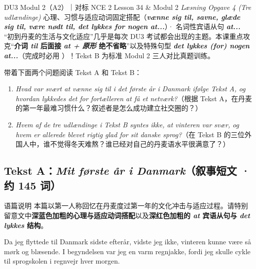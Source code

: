 {DU3 Modul 2（A2）｜对标 NCE 2 Lesson 34 \& Modul 2 \textit{Læsning Opgave 4 (Tre udlændinge)}}
{心理、习惯与适应动词固定搭配（\textbf{\textit{vænne sig til, savne, glæde sig til, være nødt til, det lykkes for nogen at...}}）· 名词性宾语从句 \textbf{\textit{at...}}}
{“初到丹麦的生活与文化适应”几乎是每次 DU3 考试都会出现的主题。本课重点攻克“\textbf{介词 \textit{til} 后面接 \textit{at + 原形} 绝不省略}”以及特殊句型 \textbf{\textit{det lykkes (for) nogen at...}}（完成时必用 ）！Tekst B 为标准 Modul 2 三人对比真题训练。}

\begin{foerduleaeser}
带着下面两个问题阅读 Tekst A 和 Tekst B：
\begin{enumerate}
  \item \textit{Hvad var svært at vænne sig til i det første år i Danmark ifølge Tekst A, og hvordan lykkedes det for fortælleren at få et netværk?}（根据 Tekst A，在丹麦的第一年最难习惯什么？叙述者是怎么成功建立社交圈的？）
  \item \textit{Hvem af de tre udlændinge i Tekst B syntes ikke, at vinteren var svær, og hvem er allerede blevet rigtig glad for sit danske sprog?}（在 Tekst B 的三位外国人中，谁不觉得冬天难熬？谁已经对自己的丹麦语水平很满意了？）
\end{enumerate}
\end{foerduleaeser}


\subsection*{Tekst A：\textit{Mit første år i Danmark}（叙事短文 · 约 145 词）}

\begin{tipbox}{语篇说明}
本篇以第一人称回忆在丹麦度过第一年的文化冲击与适应过程。请特别留意文中\textbf{\color{NCDNavy}深蓝色加粗的心理与适应动词搭配}以及\textbf{\color{NCDRed}深红色加粗的 \textit{at} 宾语从句与 \textit{det lykkes} 结构}。
\end{tipbox}

Da jeg flyttede til Danmark sidste efterår, vidste jeg ikke,  vinteren kunne være så mørk og blæsende. I begyndelsen var jeg  en varm regnjakke, fordi jeg skulle cykle til sprogskolen i regnvejr hver morgen.

